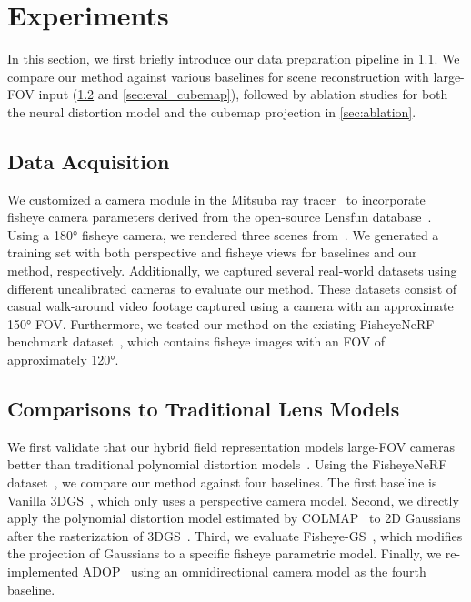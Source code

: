 

\section{Experiments\label{sec:experiments}}
In this section, we first briefly introduce our data preparation pipeline in \cref{sec:data}.
We compare our method against various baselines for scene reconstruction with large-FOV input (\cref{sec:evaluation} and \cref{sec:eval_cubemap}), followed by ablation studies for both the neural distortion model and the cubemap projection in \cref{sec:ablation}.

\subsection{Data Acquisition}
\label{sec:data}
We customized a camera module in the Mitsuba ray tracer~\cite{jakob2010mitsuba} to incorporate fisheye camera parameters derived from the open-source Lensfun database~\cite{lensfun}. Using a 180\si{\degree} fisheye camera, we rendered three scenes from~\cite{resources16}. We generated a training set with both perspective and fisheye views for baselines and our method, respectively. Additionally, we captured several real-world datasets using different uncalibrated cameras to evaluate our method. These datasets consist of casual walk-around video footage captured using a camera with an approximate 150\si{\degree} FOV. Furthermore, we tested our method on the existing FisheyeNeRF benchmark dataset~\cite{jeong2021self}, which contains fisheye images with an FOV of approximately 120\si{\degree}.






 
\subsection{Comparisons to Traditional Lens Models} 
\label{sec:evaluation}
We first validate that our hybrid field representation models large-FOV cameras better than traditional polynomial distortion models~\cite{opencv_library, schoenberger2016sfm}. Using the FisheyeNeRF dataset~\cite{jeong2021self}, we compare our method against four baselines. The first baseline is Vanilla 3DGS~\cite{kerbl20233d}, which only uses a perspective camera model. Second, we directly apply the polynomial distortion model estimated by COLMAP~\cite{schoenberger2016sfm} to 2D Gaussians after the rasterization of 3DGS~\cite{kerbl20233d}. Third, we evaluate Fisheye-GS~\cite{liao2024fisheye}, which modifies the projection of Gaussians to a specific fisheye parametric model. Finally, we re-implemented ADOP~\cite{ruckert2022adop} using an omnidirectional camera model as the fourth baseline.


